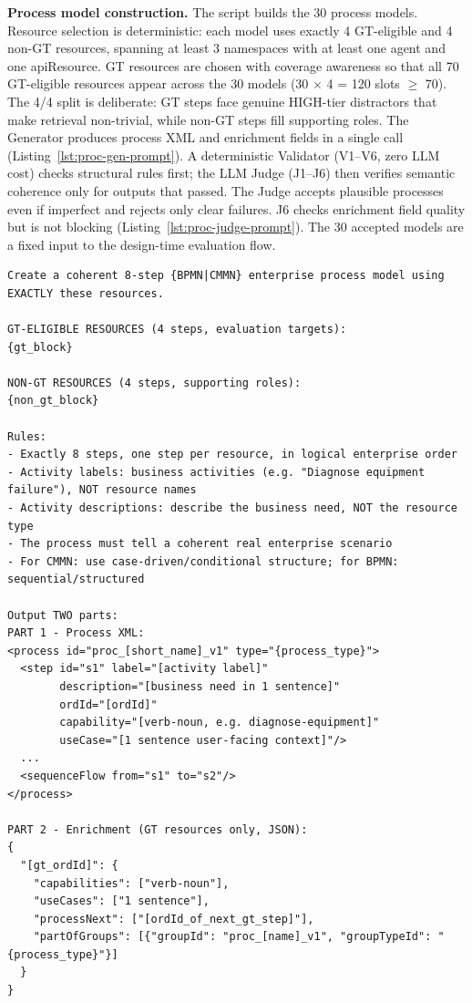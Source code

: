 \medskip\noindent\textbf{Process model construction.} The script  builds the 30 process models. Resource selection is deterministic: each model uses exactly 4 GT-eligible and 4 non-GT resources, spanning at least 3 namespaces with at least one agent and one apiResource. GT resources are chosen with coverage awareness so that all 70 GT-eligible resources appear across the 30 models (30 $\times$ 4 = 120 slots $\geq$ 70). The 4/4 split is deliberate: GT steps face genuine HIGH-tier distractors that make retrieval non-trivial, while non-GT steps fill supporting roles. The Generator produces process XML and enrichment fields in a single call (Listing~\ref{lst:proc-gen-prompt}). A deterministic Validator (V1--V6, zero LLM cost) checks structural rules first; the LLM Judge (J1--J6) then verifies semantic coherence only for outputs that passed. The Judge accepts plausible processes even if imperfect and rejects only clear failures. J6 checks enrichment field quality but is not blocking (Listing~\ref{lst:proc-judge-prompt}). The 30 accepted models are a fixed input to the design-time evaluation flow.

\begin{lstlisting}[float=!t, floatplacement=!t, basicstyle=\ttfamily\scriptsize, breaklines=true, frame=single, label={lst:proc-gen-prompt}, caption={Process Generator prompt (\texttt{generate\_processes.py}). Model: \texttt{claude-haiku-4.5}, temp=0.0, seed=42.}]
Create a coherent 8-step {BPMN|CMMN} enterprise process model using EXACTLY these resources.

GT-ELIGIBLE RESOURCES (4 steps, evaluation targets):
{gt_block}

NON-GT RESOURCES (4 steps, supporting roles):
{non_gt_block}

Rules:
- Exactly 8 steps, one step per resource, in logical enterprise order
- Activity labels: business activities (e.g. "Diagnose equipment failure"), NOT resource names
- Activity descriptions: describe the business need, NOT the resource type
- The process must tell a coherent real enterprise scenario
- For CMMN: use case-driven/conditional structure; for BPMN: sequential/structured

Output TWO parts:
PART 1 - Process XML:
<process id="proc_[short_name]_v1" type="{process_type}">
  <step id="s1" label="[activity label]"
        description="[business need in 1 sentence]"
        ordId="[ordId]"
        capability="[verb-noun, e.g. diagnose-equipment]"
        useCase="[1 sentence user-facing context]"/>
  ...
  <sequenceFlow from="s1" to="s2"/>
</process>

PART 2 - Enrichment (GT resources only, JSON):
{
  "[gt_ordId]": {
    "capabilities": ["verb-noun"],
    "useCases": ["1 sentence"],
    "processNext": ["[ordId_of_next_gt_step]"],
    "partOfGroups": [{"groupId": "proc_[name]_v1", "groupTypeId": "{process_type}"}]
  }
}
\end{lstlisting}

